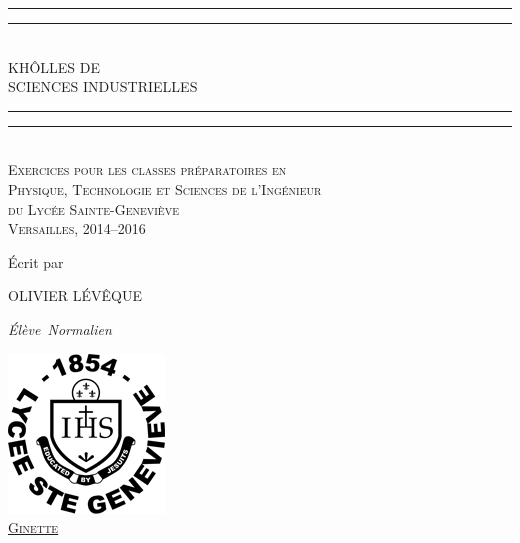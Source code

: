 \begingroup %
\centering %

\vspace*{\baselineskip} %
\rule{\textwidth}{1.6pt}\vspace*{-\baselineskip}\vspace*{2pt} %
\rule{\textwidth}{0.4pt}\\[\baselineskip] %

{\LARGE KHÔLLES DE \\[0.3\baselineskip] SCIENCES INDUSTRIELLES}\\[0.2\baselineskip] %

\rule{\textwidth}{0.4pt}\vspace*{-\baselineskip}\vspace{3.2pt} %
\rule{\textwidth}{1.6pt}\\[\baselineskip] %

\scshape %
Exercices pour les classes pr\'eparatoires en \\ %
Physique, Technologie et Sciences de l'Ing\'enieur \\ %
du Lyc\'ee Sainte-Genevi\`eve \\[\baselineskip] %
Versailles,  2014--2016\par %

\vspace*{2\baselineskip} %

\'Ecrit par \\[\baselineskip]
{\Large OLIVIER LÉV\^EQUE \par} %
{\itshape \'El\`eve\ Normalien\par} %

\vfill %

\href{http://wwww.bginette.com}{\includegraphics[scale=0.3]{png/logo.png}}\\
\href{http://wwww.bginette.com}{{\scshape Ginette}} \\[0.3\baselineskip] %

\endgroup